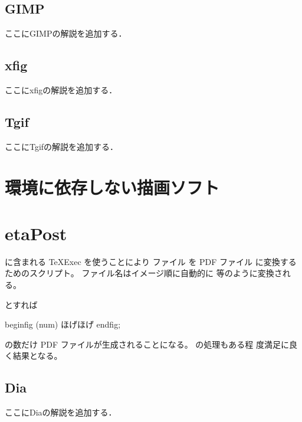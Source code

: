 \subsection{GIMP}

\begin{append}
 ここにGIMPの解説を追加する．
\end{append}


\subsection{xfig}

\begin{append}
 ここにxfigの解説を追加する．
\end{append}


\subsection{Tgif}

\begin{append}
 ここにTgifの解説を追加する．
\end{append}


\section{環境に依存しない描画ソフト}



\section{\texorpdfstring\MP MetaPost}

\ConTeXt に含まれる \TeX Exec を使うことにより \MP ファイル
 を PDF ファイル  に変換するためのスクリプト。
ファイル名はイメージ順に自動的に  等のように変換される。
\begin{InTerm}
\end{InTerm}
とすれば
\begin{InText}
 beginfig (num)
 ほげほげ
 endfig;
\end{InText}
の数だけ PDF ファイルが生成されることになる。 \BB の処理もある程
度満足に良く結果となる。


\subsection{Dia}

\begin{append}
 ここにDiaの解説を追加する．
\end{append}


